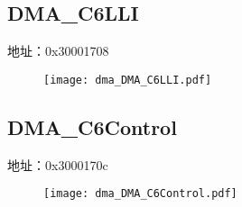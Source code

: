 \subsection{DMA\_C6LLI}
\label{dma-DMA-C6LLI}
地址：0x30001708
 \begin{figure}[H]
\texttt{[image: dma\_DMA\_C6LLI.pdf]}
\end{figure}

\subsection{DMA\_C6Control}
\label{dma-DMA-C6Control}
地址：0x3000170c
 \begin{figure}[H]
\texttt{[image: dma\_DMA\_C6Control.pdf]}
\end{figure}

